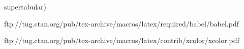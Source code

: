 
supertabular)




%
\usepackage{calc}

ftp://tug.ctan.org/pub/tex-archive/macros/latex/required/babel/babel.pdf
\usepackage[
ngerman,
]{babel}

ftp://tug.ctan.org/pub/tex-archive/macros/latex/contrib/xcolor/xcolor.pdf
\usepackage[
table %
]{xcolor}


